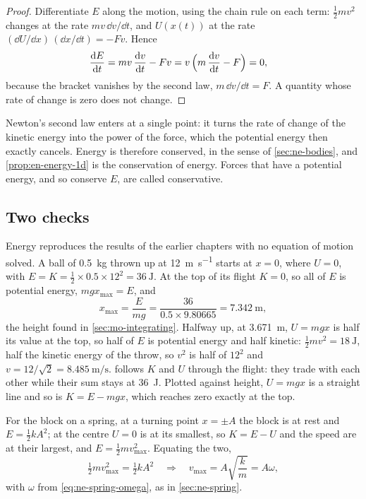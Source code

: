 \begin{proof}
Differentiate $E$ along the motion, using the chain rule on each term:
$\frac12 mv^2$ changes at the rate $mv\,\dd v/\dd t$, and $U(x(t))$ at the
rate $(\dd U/\dd x)\,(\dd x/\dd t) = -F v$. Hence
\begin{align*}
   \frac{\mathrm{d} E}{\mathrm{d} t} &= m v\,\frac{\mathrm{d} v}{\mathrm{d} t} - F v
   = v\,\Bigl(m\,\frac{\mathrm{d} v}{\mathrm{d} t} - F\Bigr) = 0 ,
\end{align*}
because the bracket vanishes by the second law, $m\,\dd v/\dd t = F$. A
quantity whose rate of change is zero does not change.
\end{proof}

Newton's second law enters at a single point: it turns the rate of change
of the kinetic energy into the power of the force, which the potential
energy then exactly cancels. Energy is therefore conserved, in the sense
of \cref{sec:ne-bodies}, and \cref{prop:en-energy-1d} is the conservation
of energy. Forces that have a potential energy, and so
conserve $E$, are called conservative.

\subsection*{Two checks}

Energy reproduces the results of the earlier chapters with no equation
of motion solved. A ball of \SI{0.5}{\kilogram} thrown up at
\SI{12}{\metre\per\second} starts at $x = 0$, where $U = 0$, with $E = K =
\frac12\times0.5\times12^2 = \SI{36}{\joule}$. At the top of its flight
$K = 0$, so all of $E$ is potential energy, $mgx_{\max} = E$, and
\begin{equation*}
   x_{\max} = \frac{E}{mg} = \frac{36}{0.5\times9.80665}
   = \SI{7.342}{\metre} ,
\end{equation*}
the height found in \cref{sec:mo-integrating}. Halfway up, at
\SI{3.671}{\metre}, $U = mgx$ is half its value at the top, so half of $E$
is potential energy and half kinetic: $\frac12 mv^2 = \SI{18}{\joule}$,
half the kinetic energy of the throw, so $v^2$ is half of $12^2$ and $v =
12/\sqrt2 = \SI{8.485}{\metre\per\second}$.  follows $K$ and $U$
through the flight: they trade with each other while their sum stays at
\SI{36}{\joule}. Plotted against height, $U = mgx$ is a straight line and
so is $K = E - mgx$, which reaches zero exactly at the top.

For the block on a spring, at a turning point $x = \pm A$ the block is at
rest and $E = \frac12 kA^2$; at the centre $U = 0$ is at its smallest, so
$K = E - U$ and the speed are at their largest, and $E = \frac12
mv_{\max}^2$. Equating the two,
\begin{equation*}
   \tfrac12 m v_{\max}^2 = \tfrac12 k A^2
   \quad\Longrightarrow\quad
   v_{\max} = A\sqrt{\frac{k}{m}} = A\omega ,
\end{equation*}
with $\omega$ from \cref{eq:ne-spring-omega}, as in \cref{sec:ne-spring}.

